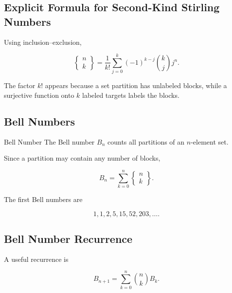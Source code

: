 \subsection{Explicit Formula for Second-Kind Stirling Numbers}
\label{subsec:stirling-second-explicit}

Using inclusion--exclusion,

\[
\boxed{
\left\{
\begin{matrix}
n\\
k
\end{matrix}
\right\}
=
\frac{1}{k!}
\sum_{j=0}^{k}
(-1)^{k-j}
\binom{k}{j}
j^n.
}
\]

The factor \(k!\) appears because a set partition has unlabeled blocks,
while a surjective function onto \(k\) labeled targets labels the
blocks.

\subsection{Bell Numbers}
\label{subsec:bell-numbers}

\begin{definitionbox}{Bell Number}
The Bell number \(B_n\) counts all partitions of an \(n\)-element set.
\end{definitionbox}

Since a partition may contain any number of blocks,

\[
\boxed{
B_n
=
\sum_{k=0}^{n}
\left\{
\begin{matrix}
n\\
k
\end{matrix}
\right\}.
}
\]

The first Bell numbers are

\[
1,1,2,5,15,52,203,\ldots.
\]

\subsection{Bell Number Recurrence}
\label{subsec:bell-number-recurrence}

A useful recurrence is

\[
\boxed{
B_{n+1}
=
\sum_{k=0}^{n}
\binom{n}{k}B_k.
}
\]


